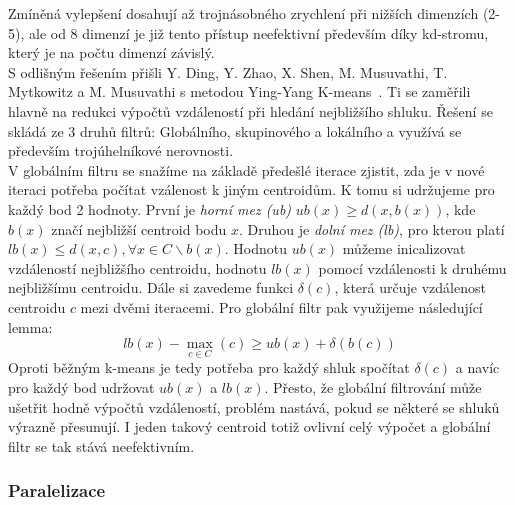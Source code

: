 Zmíněná vylepšení dosahují až trojnásobného zrychlení při nižších dimenzích (2-5), ale od 8 dimenzí je již tento přístup neefektivní především díky kd-stromu, který je na počtu dimenzí závislý.\\

S odlišným řešením přišli Y. Ding, Y. Zhao,  X. Shen, M. Musuvathi, T. Mytkowitz a M. Musuvathi s metodou Ying-Yang K-means~\cite{ding15}. Ti se zaměřili hlavně na redukci výpočtů vzdáleností při hledání nejbližšího shluku. Řešení se skládá ze 3 druhů filtrů: Globálního, skupinového a lokálního a využívá se především trojúhelníkové nerovnosti.\\

V globálním filtru se snažíme na základě předešlé iterace zjistit, zda je v nové iteraci potřeba počítat vzálenost k jiným centroidům. K tomu si udržujeme pro každý bod 2 hodnoty. První je \textit{horní mez (ub)} $ub(x) \ge d(x,b(x))$, kde $b(x)$ značí nejbližší centroid bodu $x$. Druhou je \textit{dolní mez (lb)}, pro kterou platí $lb(x) \le d(x,c), \forall x \in C\backslash b(x)$. Hodnotu $ub(x)$ můžeme inicalizovat vzdáleností nejbližšího centroidu, hodnotu $lb(x)$ pomocí vzdálenosti k druhému nejbližšímu centroidu. Dále si zavedeme funkci $\delta(c)$, která určuje vzdálenost centroidu $c$ mezi dvěmi iteracemi. Pro globální filtr pak využijeme následující lemma:
$$lb(x) - \max\limits_{c\in C}(c) \ge ub(x) + \delta(b(c))$$
Oproti běžným k-means je tedy potřeba pro každý shluk spočítat $\delta(c)$ a navíc pro každý bod udržovat $ub(x)$ a $lb(x)$. Přesto, že globální filtrování může ušetřit hodně výpočtů vzdáleností, problém nastává, pokud se některé se shluků výrazně přesunují. I jeden takový centroid totiž ovlivní celý výpočet a globální filtr se tak stává neefektivním.

\subsubsection{Paralelizace}
